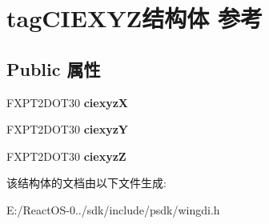 \hypertarget{structtag_c_i_e_x_y_z}{}\section{tag\+C\+I\+E\+X\+Y\+Z结构体 参考}
\label{structtag_c_i_e_x_y_z}
\subsection*{Public 属性}
\begin{DoxyCompactItemize}
\item 
\mbox{\label{structtag_c_i_e_x_y_z_ab7e231ebd6040bfcbafe2d01e43f16e9}} 
F\+X\+P\+T2\+D\+O\+T30 {\bfseries ciexyzX}
\item 
\mbox{\label{structtag_c_i_e_x_y_z_ac1909fe86e57b630bbad6f7e272735cd}} 
F\+X\+P\+T2\+D\+O\+T30 {\bfseries ciexyzY}
\item 
\mbox{\label{structtag_c_i_e_x_y_z_a0dfcf947a02c20b4362d833cf0c62e97}} 
F\+X\+P\+T2\+D\+O\+T30 {\bfseries ciexyzZ}
\end{DoxyCompactItemize}


该结构体的文档由以下文件生成\+:\begin{DoxyCompactItemize}
\item 
E\+:/\+React\+O\+S-\/0../sdk/include/psdk/wingdi.\+h\end{DoxyCompactItemize}
